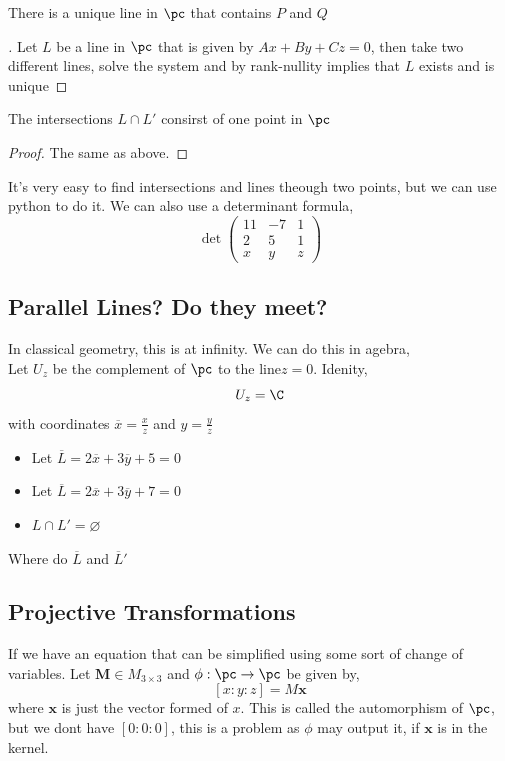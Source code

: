 \documentclass{article}
\begin{document}
\begin{nthm}[]
  There is a unique line in $\pc$ that contains $P$ and $Q$
\end{nthm}

\begin{proof}[]
  Let $L$ be a line in $\pc$ that is given by $Ax + By + Cz = 0$, then take two different lines, solve the system and by rank-nullity implies that $L$ exists and is unique
\end{proof}

\begin{nthm}[]
  The intersections $L \cap L'$ consirst of one point in $\pc$
\end{nthm}
\begin{proof}
  The same as above.
\end{proof}

It's very easy to find intersections and lines theough two points, but we can use python to do it. We can also use a determinant formula,
$$ \det \begin{pmatrix}
11 & -7 & 1\\
2 & 5 & 1\\
x & y & z
\end{pmatrix} $$

\subsection{Parallel Lines? Do they meet?}
In classical geometry, this is at infinity. We can do this in agebra,\\

Let $U_z$ be the complement of $\pc$ to the line$z= 0$. Idenity,
$$ U_z = \C $$
with coordinates $\overline x = \frac{x}{z}$ and $y = \frac{y}{z}$

\begin{itemize}
  \item Let $\overline L = 2\overline x + 3\overline y + 5 = 0$
  \item Let $\overline L = 2\overline x + 3\overline y + 7 = 0$
  \item $L \cap L' = \varnothing$
\end{itemize}

\begin{question}
  Where do $\overline L$ and $\overline L'$
\end{question}

\subsection{Projective Transformations}
If we have an equation that can be simplified using some sort of change of variables. Let $\mathbf{M} \in M_{3\times 3}$ and $\phi : \pc \to \pc$ be given by,
$$ [x : y : z] = M \mathbf{x} $$
where $\mathbf{x}$ is just the vector formed of $x$. This is called the automorphism of $\pc$, but we dont have $[0 : 0 : 0]$, this is a problem as $\phi$ may output it, if $\mathbf{x}$ is in the kernel.
\end{document}
